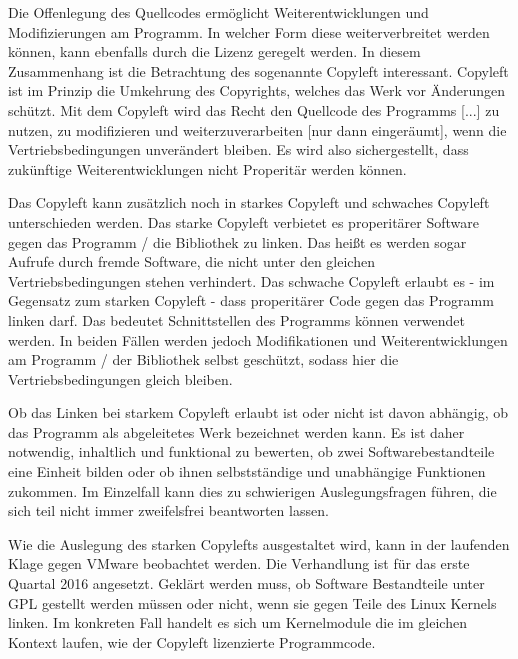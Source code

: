 Die Offenlegung des Quellcodes erm\"oglicht Weiterentwicklungen und Modifizierungen am Programm. In welcher Form diese weiterverbreitet werden k\"onnen, kann ebenfalls durch die Lizenz geregelt werden. In diesem Zusammenhang ist die Betrachtung des sogenannte Copyleft interessant. Copyleft ist im Prinzip die Umkehrung des Copyrights, welches das Werk vor \"Anderungen sch\"utzt. Mit dem Copyleft wird das Recht den \glqq{}Quellcode des Programms [...] zu nutzen, zu modifizieren und weiterzuverarbeiten [nur dann einger\"aumt], wenn die Vertriebsbedingungen unver\"andert bleiben.\grqq{} Es wird also sichergestellt, dass zuk\"unftige Weiterentwicklungen nicht Properit\"ar werden k\"onnen. 

Das Copyleft kann zus\"atzlich noch in starkes Copyleft und schwaches Copyleft unterschieden werden. Das starke Copyleft verbietet es properit\"arer Software gegen das Programm / die Bibliothek zu linken. Das heißt es werden sogar Aufrufe durch fremde Software, die nicht unter den gleichen Vertriebsbedingungen stehen verhindert. Das schwache Copyleft erlaubt es - im Gegensatz zum starken Copyleft - dass properit\"arer Code gegen das Programm linken darf. Das bedeutet Schnittstellen des Programms k\"onnen verwendet werden. In beiden F\"allen werden jedoch Modifikationen und Weiterentwicklungen am Programm / der Bibliothek selbst gesch\"utzt, sodass hier die Vertriebsbedingungen gleich bleiben. 

Ob das Linken bei starkem Copyleft erlaubt ist oder nicht ist davon abh\"angig, ob das Programm als abgeleitetes Werk bezeichnet werden kann. \glqq{}Es ist daher notwendig, inhaltlich und funktional zu bewerten, ob zwei Softwarebestandteile eine Einheit bilden oder ob ihnen selbstst\"andige und unabh\"angige Funktionen zukommen. Im Einzelfall kann dies zu schwierigen Auslegungsfragen f\"uhren, die sich teil nicht immer zweifelsfrei beantworten lassen.\grqq{} 

Wie die Auslegung des starken Copylefts ausgestaltet wird, kann in der laufenden Klage gegen VMware beobachtet werden. Die Verhandlung ist f\"ur das erste Quartal 2016 angesetzt. Gekl\"art werden muss, ob Software Bestandteile unter GPL gestellt werden m\"ussen oder nicht, wenn sie gegen Teile des Linux Kernels linken. Im konkreten Fall handelt es sich um Kernelmodule die im gleichen Kontext laufen, wie der Copyleft lizenzierte Programmcode. 

